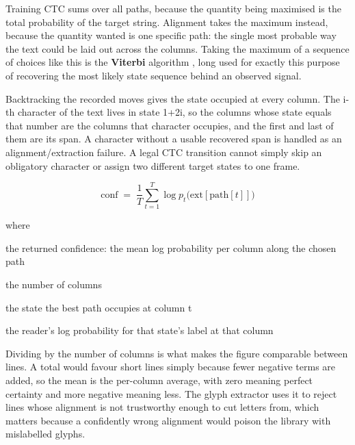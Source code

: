 Training CTC sums over all paths, because the quantity being maximised is the total probability of the target string. Alignment takes the maximum instead, because the quantity wanted is one specific path: the single most probable way the text could be laid out across the columns. Taking the maximum of a sequence of choices like this is the \textbf{Viterbi} algorithm \cite{viterbi1967}, long used for exactly this purpose of recovering the most likely state sequence behind an observed signal.


Backtracking the recorded moves gives the state occupied at every column. The i-th character of the text lives in state 1+2i, so the columns whose state equals that number are the columns that character occupies, and the first and last of them are its span. A character without a usable recovered span is handled as an alignment/extraction failure. A legal CTC transition cannot simply skip an obligatory character or assign two different target states to one frame.



\begin{equation}
\mathrm{conf} \;=\; \frac{1}{T} \sum_{t=1}^{T} \log p_t\big(\mathrm{ext}[\mathrm{path}[t]]\big)
\end{equation}

\noindent where
\begin{description}[leftmargin=2.4em,style=nextline,font=\normalfont\ttfamily]\setlength\itemsep{1pt}
  \item[{$\mathrm{conf}$}] \normalfont the returned confidence: the mean log probability per column along the chosen path
  \item[{$T$}] \normalfont the number of columns
  \item[{$\mathrm{path}[t]$}] \normalfont the state the best path occupies at column t
  \item[{$\log p_t(\cdot)$}] \normalfont the reader's log probability for that state's label at that column
\end{description}
Dividing by the number of columns is what makes the figure comparable between lines. A total would favour short lines simply because fewer negative terms are added, so the mean is the per-column average, with zero meaning perfect certainty and more negative meaning less. The glyph extractor uses it to reject lines whose alignment is not trustworthy enough to cut letters from, which matters because a confidently wrong alignment would poison the library with mislabelled glyphs.


